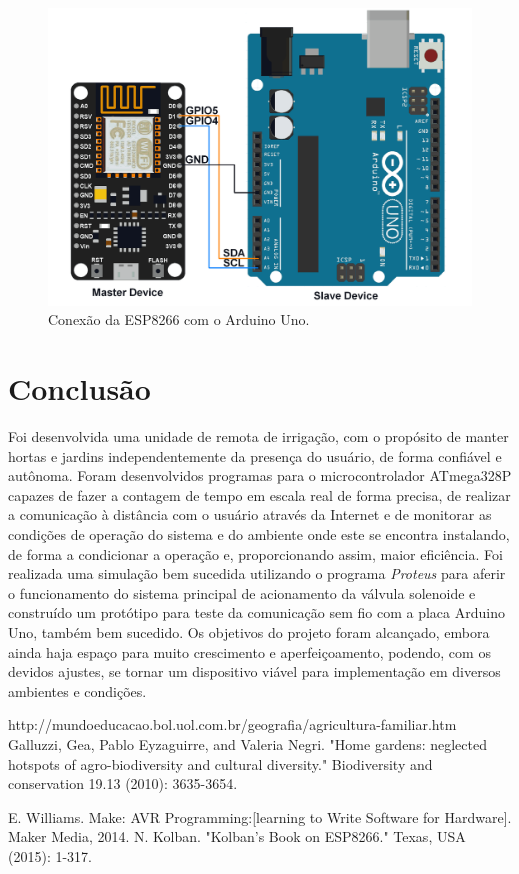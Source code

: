 \documentclass[conference]{IEEEtran}
\begin{document}
\begin{figure}[htbp]
\centerline{\includegraphics[angle=0, scale=.2]{images/Img4.png}}
\caption{Conexão da ESP8266 com o Arduino Uno.}
\label{fig4}
\end{figure}


\section{Conclusão}

Foi desenvolvida uma unidade de remota de irrigação, com o propósito de manter hortas e jardins independentemente da presença do usuário, de forma confiável e autônoma. Foram desenvolvidos programas para o microcontrolador ATmega328P capazes de fazer a contagem de tempo em escala real de forma precisa, de realizar a comunicação à distância com o usuário através da Internet e de monitorar as condições de operação do sistema e do ambiente onde este se encontra instalando, de forma a condicionar a operação e, proporcionando assim, maior eficiência. Foi realizada uma simulação bem sucedida utilizando o programa \textit{Proteus} para aferir o funcionamento do sistema principal de acionamento da válvula solenoide e construído um protótipo para teste da comunicação sem fio com a placa Arduino Uno, também bem sucedido. Os objetivos do projeto foram alcançado, embora ainda haja espaço para muito crescimento e aperfeiçoamento, podendo, com os devidos ajustes, se tornar um dispositivo viável para implementação em diversos ambientes e condições.

\begin{thebibliography}{00}
 http://mundoeducacao.bol.uol.com.br/geografia/agricultura-familiar.htm
 Galluzzi, Gea, Pablo Eyzaguirre, and Valeria Negri. "Home gardens: neglected hotspots of agro-biodiversity and cultural diversity." Biodiversity and conservation 19.13 (2010): 3635-3654.

 E. Williams. Make: AVR Programming:[learning to Write Software for Hardware]. Maker Media, 2014.
 N. Kolban. "Kolban’s Book on ESP8266." Texas, USA (2015): 1-317.
\end{thebibliography}
\end{document}
